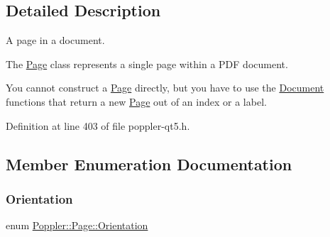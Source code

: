 \subsection{Detailed Description}
A page in a document. 

The \hyperlink{class_poppler_1_1_page}{Page} class represents a single page within a P\+DF document.

You cannot construct a \hyperlink{class_poppler_1_1_page}{Page} directly, but you have to use the \hyperlink{class_poppler_1_1_document}{Document} functions that return a new \hyperlink{class_poppler_1_1_page}{Page} out of an index or a label. 

Definition at line 403 of file poppler-\/qt5.\+h.



\subsection{Member Enumeration Documentation}
\mbox{\label{class_poppler_1_1_page_a1075c38ddba641b4dc23ee4860302cc2}} 
\subsubsection{\texorpdfstring{Orientation}{Orientation}}
{\footnotesize\ttfamily enum \hyperlink{class_poppler_1_1_page_a1075c38ddba641b4dc23ee4860302cc2}{Poppler\+::\+Page\+::\+Orientation}}

